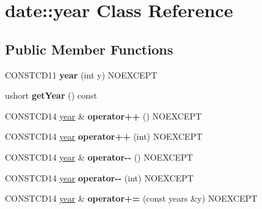 \hypertarget{classdate_1_1year}{}\section{date\+::year Class Reference}
\label{classdate_1_1year}
\subsection*{Public Member Functions}
\begin{DoxyCompactItemize}
\item 
\mbox{\label{classdate_1_1year_a748216d81ee3e681b51af32dad6d280d}} 
C\+O\+N\+S\+T\+C\+D11 {\bfseries year} (int y) N\+O\+E\+X\+C\+E\+PT
\item 
\mbox{\label{classdate_1_1year_a903d37e7f9867fb1cad75dbe08ee5fed}} 
ushort {\bfseries get\+Year} () const
\item 
\mbox{\label{classdate_1_1year_a5417a56fb580b0453a943f8f94ef5471}} 
C\+O\+N\+S\+T\+C\+D14 \mbox{\hyperlink{classdate_1_1year}{year}} \& {\bfseries operator++} () N\+O\+E\+X\+C\+E\+PT
\item 
\mbox{\label{classdate_1_1year_a628a45d4d5eb67edea951e1a656c3e46}} 
C\+O\+N\+S\+T\+C\+D14 \mbox{\hyperlink{classdate_1_1year}{year}} {\bfseries operator++} (int) N\+O\+E\+X\+C\+E\+PT
\item 
\mbox{\label{classdate_1_1year_a6525559f224c282a2d1992eb47df77f8}} 
C\+O\+N\+S\+T\+C\+D14 \mbox{\hyperlink{classdate_1_1year}{year}} \& {\bfseries operator-\/-\/} () N\+O\+E\+X\+C\+E\+PT
\item 
\mbox{\label{classdate_1_1year_a7113eb5f18f44d5a92517b11a31d560f}} 
C\+O\+N\+S\+T\+C\+D14 \mbox{\hyperlink{classdate_1_1year}{year}} {\bfseries operator-\/-\/} (int) N\+O\+E\+X\+C\+E\+PT
\item 
\mbox{\label{classdate_1_1year_af59000cb6a5517b6e115265564c3651f}} 
C\+O\+N\+S\+T\+C\+D14 \mbox{\hyperlink{classdate_1_1year}{year}} \& {\bfseries operator+=} (const years \&y) N\+O\+E\+X\+C\+E\+PT
\item 
\mbox{\label{classdate_1_1year_a924f10124422eb84f9bfb94cede5b619}} 

\end{DoxyCompactItemize}
